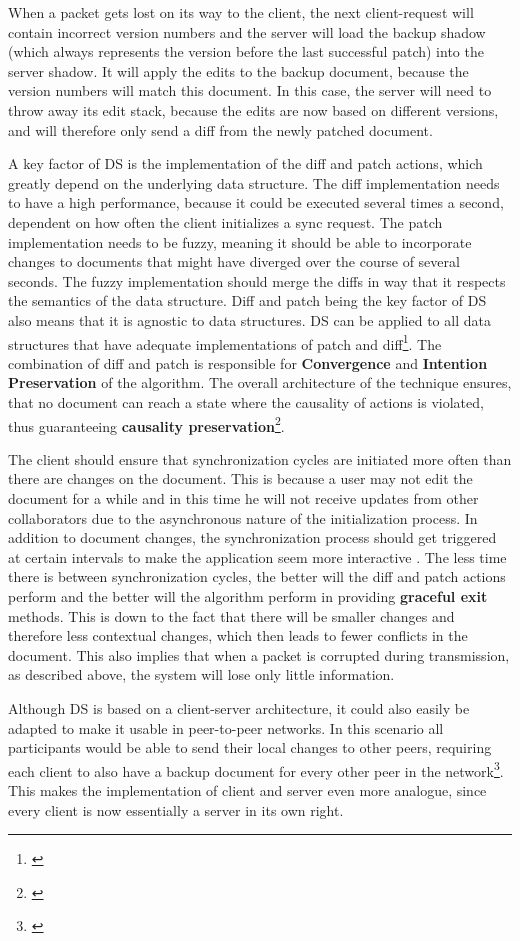 When a packet gets lost on its way to the client, the next client-request will contain incorrect version numbers and the server will load the backup shadow (which always represents the version before the last successful patch) into the server shadow. It will apply the edits to the backup document, because the version numbers will match this document. In this case, the server will need to throw away its edit stack, because the edits are now based on different versions, and will therefore only send a diff from the newly patched document.

A key factor of DS is the implementation of the diff and patch actions, which greatly depend on the underlying data structure. The diff implementation needs to have a high performance, because it could be executed several times a second, dependent on how often the client initializes a sync request. The patch implementation needs to be fuzzy, meaning it should be able to incorporate changes to documents that might have diverged over the course of several seconds. The fuzzy implementation should merge the diffs in way that it respects the semantics of the data structure. Diff and patch being the key factor of DS also means that it is agnostic to data structures. DS can be applied to all data structures that have adequate implementations of patch and diff\footnote{\cite[p. 5]{fraser2009differential}}. The combination of diff and patch is responsible for \textbf{Convergence} and \textbf{Intention Preservation} of the algorithm. The overall architecture of the technique ensures, that no document can reach a state where the causality of actions is violated, thus guaranteeing \textbf{causality preservation}\footnote{\cite[p. 1]{fraser2009differential}}.

The client should ensure that synchronization cycles are initiated more often than there are changes on the document. This is because a user may not edit the document for a while and in this time he will not receive updates from other collaborators due to the asynchronous nature of the initialization process. In addition to document changes, the synchronization process should get triggered at certain intervals to make the application seem more interactive \cite{instantSyncThesis}. The less time there is between synchronization cycles, the better will the diff and patch actions perform and the better will the algorithm perform in providing \textbf{graceful exit} methods. This is down to the fact that there will be smaller changes and therefore less contextual changes, which then leads to fewer conflicts in the document. This also implies that when a packet is corrupted during transmission, as described above, the system will lose only little information.

Although DS is based on a client-server architecture, it could also easily be adapted to make it usable in peer-to-peer networks. In this scenario all participants would be able to send their local changes to other peers, requiring each client to also have a backup document for every other peer in the network\footnote{\cite[39:20min]{fraser2009video}}. This makes the implementation of client and server even more analogue, since every client is now essentially a server in its own right.

